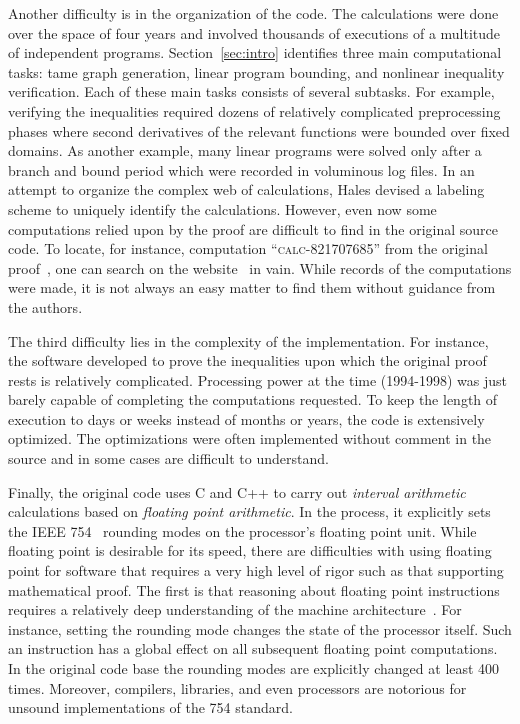 \documentclass[11pt]{amsart}
\def\calc#1{{\textsc{calc-#1}}}
\begin{document}
Another difficulty is in the organization of the code. The
calculations were done over the space of four years and involved
thousands of executions of a multitude of independent programs. 
Section~\ref{sec:intro} identifies  three main computational
tasks: tame graph generation, linear program
bounding, and nonlinear inequality verification.  Each of these main
tasks consists of several subtasks.  For example, verifying the
inequalities required dozens of relatively complicated preprocessing
phases where second derivatives of the relevant functions were bounded
over fixed domains.  As another example, many linear programs were
solved only after a branch and bound period which were recorded in
voluminous log files.  In an attempt to organize the complex 
web of calculations, Hales
devised a labeling scheme to uniquely identify the calculations.
However, even now some computations relied upon by the proof are
difficult to find in the original source code.  To locate, for
instance, computation ``\calc{821707685}'' from the original
proof~\cite[p.159]{Hales:2006:DCG}, one can search on the
website~\cite{website:Hales:1998:Code} in vain.  While records of the
computations were made, it is not always an easy matter to find them
without guidance from the authors.

The third difficulty lies in the complexity of the implementation. For
instance, the software developed to prove the inequalities upon which
the original proof rests is relatively complicated. Processing power
at the time (1994-1998) was just barely capable of completing the
computations requested. To keep the length of execution to days or
weeks instead of months or years, the code is extensively
optimized. The optimizations were often implemented without comment in
the source and in some cases are difficult to understand.

Finally, the original code uses C and C++ to carry out \emph{interval
arithmetic} calculations based on \emph{floating point arithmetic}. In
the process, it explicitly sets the IEEE 754~\cite{IEEE:1985:IEE754}
rounding modes on the processor's floating point unit.  While floating
point is desirable for its speed, there are difficulties with using
floating point for software that requires a very high level of rigor
such as that supporting mathematical proof.  The first is that
reasoning about floating point instructions requires a relatively deep
understanding of the machine architecture~\cite{Monniaux:2008:TOPLAS}.
For instance, setting the rounding mode changes the state of the
processor itself. Such an instruction has a global effect on all
subsequent floating point computations.  In the original code base the
rounding modes are explicitly changed at least 400 times.  Moreover,
compilers, libraries, and even processors are notorious for unsound
implementations of the 754 standard.  
\end{document}
